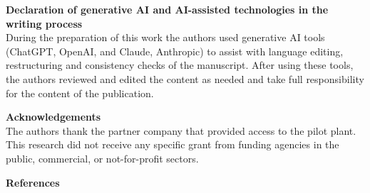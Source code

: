 \documentclass[11pt, letterpaper]{article}
\begin{document}
\noindent
\textbf{Declaration of generative AI and AI-assisted technologies in the writing process}\\
During the preparation of this work the authors used generative AI tools (ChatGPT, OpenAI, and Claude, Anthropic) to assist with language editing, restructuring and consistency checks of the manuscript. After using these tools, the authors reviewed and edited the content as needed and take full responsibility for the content of the publication.

\noindent
\textbf{Acknowledgements}\\
The authors thank the partner company that provided access to the pilot plant. This research did not receive any specific grant from funding agencies in the public, commercial, or not-for-profit sectors.

\noindent
\textbf{References}\par
\end{document}
